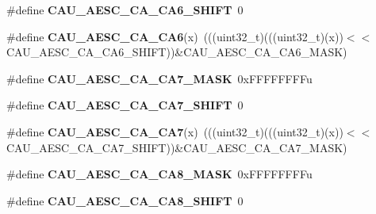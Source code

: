 \begin{DoxyCompactItemize}
\item 
\#define {\bfseries C\+A\+U\+\_\+\+A\+E\+S\+C\+\_\+\+C\+A\+\_\+\+C\+A6\+\_\+\+S\+H\+I\+FT}~0\hypertarget{group__CAU__Register__Masks_gaa8448e0d27851e9f7c9277c78b46909f}{}\label{group__CAU__Register__Masks_gaa8448e0d27851e9f7c9277c78b46909f}

\item 
\#define {\bfseries C\+A\+U\+\_\+\+A\+E\+S\+C\+\_\+\+C\+A\+\_\+\+C\+A6}(x)~(((uint32\+\_\+t)(((uint32\+\_\+t)(x))$<$$<$C\+A\+U\+\_\+\+A\+E\+S\+C\+\_\+\+C\+A\+\_\+\+C\+A6\+\_\+\+S\+H\+I\+FT))\&C\+A\+U\+\_\+\+A\+E\+S\+C\+\_\+\+C\+A\+\_\+\+C\+A6\+\_\+\+M\+A\+SK)\hypertarget{group__CAU__Register__Masks_ga1a0bf645c20b2e4c7c6a238360e609f5}{}\label{group__CAU__Register__Masks_ga1a0bf645c20b2e4c7c6a238360e609f5}

\item 
\#define {\bfseries C\+A\+U\+\_\+\+A\+E\+S\+C\+\_\+\+C\+A\+\_\+\+C\+A7\+\_\+\+M\+A\+SK}~0x\+F\+F\+F\+F\+F\+F\+F\+Fu\hypertarget{group__CAU__Register__Masks_ga52597534749f65beb43a15fc74aafb0e}{}\label{group__CAU__Register__Masks_ga52597534749f65beb43a15fc74aafb0e}

\item 
\#define {\bfseries C\+A\+U\+\_\+\+A\+E\+S\+C\+\_\+\+C\+A\+\_\+\+C\+A7\+\_\+\+S\+H\+I\+FT}~0\hypertarget{group__CAU__Register__Masks_gaf1760cda5d2b0930cef17ec6966d81c1}{}\label{group__CAU__Register__Masks_gaf1760cda5d2b0930cef17ec6966d81c1}

\item 
\#define {\bfseries C\+A\+U\+\_\+\+A\+E\+S\+C\+\_\+\+C\+A\+\_\+\+C\+A7}(x)~(((uint32\+\_\+t)(((uint32\+\_\+t)(x))$<$$<$C\+A\+U\+\_\+\+A\+E\+S\+C\+\_\+\+C\+A\+\_\+\+C\+A7\+\_\+\+S\+H\+I\+FT))\&C\+A\+U\+\_\+\+A\+E\+S\+C\+\_\+\+C\+A\+\_\+\+C\+A7\+\_\+\+M\+A\+SK)\hypertarget{group__CAU__Register__Masks_gaed829e4b9b6913adaac02b6bbdff62f1}{}\label{group__CAU__Register__Masks_gaed829e4b9b6913adaac02b6bbdff62f1}

\item 
\#define {\bfseries C\+A\+U\+\_\+\+A\+E\+S\+C\+\_\+\+C\+A\+\_\+\+C\+A8\+\_\+\+M\+A\+SK}~0x\+F\+F\+F\+F\+F\+F\+F\+Fu\hypertarget{group__CAU__Register__Masks_ga7d4416b298869da3e7c79f6a3443f015}{}\label{group__CAU__Register__Masks_ga7d4416b298869da3e7c79f6a3443f015}

\item 
\#define {\bfseries C\+A\+U\+\_\+\+A\+E\+S\+C\+\_\+\+C\+A\+\_\+\+C\+A8\+\_\+\+S\+H\+I\+FT}~0\hypertarget{group__CAU__Register__Masks_ga6498c3198edfe7b02dee8cb187511abb}{}\label{group__CAU__Register__Masks_ga6498c3198edfe7b02dee8cb187511abb}


\end{DoxyCompactItemize}
